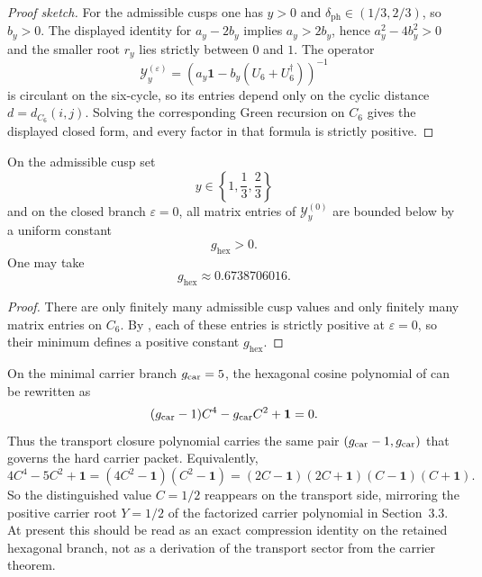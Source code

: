 \begin{proof}[Proof sketch]
For the admissible cusps one has $y>0$ and $\delta_{\mathrm{ph}}\in(1/3,2/3)$, so $b_y>0$. The
displayed identity for $a_y-2b_y$ implies $a_y>2b_y$, hence $a_y^2-4b_y^2>0$ and the smaller
root $r_y$ lies strictly between $0$ and $1$. The operator
\[
\mathcal Y_y^{(\varepsilon)}=(a_y\mathbf 1-b_y(U_6+U_6^\dagger))^{-1}
\]
is circulant on the six-cycle, so its entries depend only on the cyclic distance
$d=d_{C_6}(i,j)$. Solving the corresponding Green recursion on $C_6$ gives the displayed closed
form, and every factor in that formula is strictly positive.
\end{proof}

\begin{corollary}
\label{cor:uniform-positive-c6-green}
On the admissible cusp set
\[
y\in\left\{1,\frac13,\frac23\right\}
\]
and on the closed branch $\varepsilon=0$, all matrix entries of $\mathcal Y_y^{(0)}$ are bounded
below by a uniform constant
\[
g_{\mathrm{hex}}>0.
\]
One may take
\[
g_{\mathrm{hex}}\approx \num{0.6738706016}.
\]
\end{corollary}

\begin{proof}
There are only finitely many admissible cusp values and only finitely many matrix entries on
$C_6$. By , each of these entries is strictly positive at
$\varepsilon=0$, so their minimum defines a positive constant $g_{\mathrm{hex}}$.
\end{proof}

\begin{remark}\label{rem:transport-rank-echo}
On the minimal carrier branch $g_{\mathrm{car}}=5$, the hexagonal cosine polynomial of  can be rewritten as
\[
(g_{\mathrm{car}}-1)C^4-g_{\mathrm{car}} C^2+\mathbf 1=0.
\]
Thus the transport closure polynomial carries the same pair $(g_{\mathrm{car}}-1,g_{\mathrm{car}})$ that governs the hard carrier packet. Equivalently,
\[
4C^4-5C^2+\mathbf 1=(4C^2-\mathbf 1)(C^2-\mathbf 1)=(2C-\mathbf 1)(2C+\mathbf 1)(C-\mathbf 1)(C+\mathbf 1).
\]
So the distinguished value $C=1/2$ reappears on the transport side, mirroring the positive carrier root $Y=1/2$ of the factorized carrier polynomial in Section~3.3. At present this should be read as an exact compression identity on the retained hexagonal branch, not as a derivation of the transport sector from the carrier theorem.
\end{remark}

